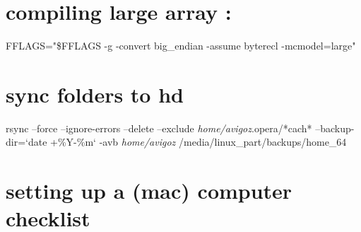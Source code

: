 \documentclass[11pt]{article}
\begin{document}
\section{compiling large array :}
\label{sec-24}

FFLAGS="\$FFLAGS -g -convert big\_endian -assume byterecl -mcmodel=large"

\section{sync folders to hd}
\label{sec-25}

rsync --force --ignore-errors --delete --exclude \emph{home/avigoz}.opera/*cach* --backup-dir=`date +\%Y-\%m` -avb \emph{home/avigoz} /media/linux\_part/backups/home\_64

\section{setting up a (mac) computer checklist}
\label{sec-26}
\end{document}
